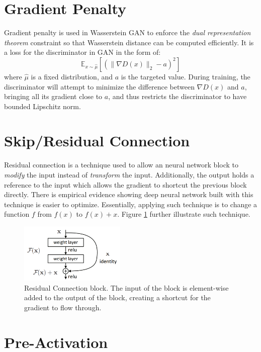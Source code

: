 \section{Gradient Penalty}
\label{app:ml:grad_pen}
Gradient penalty is used in Wasserstein GAN to enforce the \textit{dual representation theorem} constraint so that Wasserstein distance can be computed efficiently. It is a loss for the discriminator in GAN in the form of:
$$
\mathbb{E}_{x \sim \hat{\mu}}\left[\left(\|\nabla D(x)\|_{2}-a\right)^{2}\right]
$$
where $\hat{\mu}$ is a fixed distribution, and $a$ is the targeted value. During training, the discriminator will attempt to minimize the difference between $\nabla D(x)$ and $a$, bringing all its gradient close to $a$, and thus restricts the discriminator to have bounded Lipschitz norm.

\section{Skip/Residual Connection}
\label{app:ml:res_conn}
Residual connection is a technique used to allow an neural network block to \textit{modify} the  input instead of \textit{transform} the input. Additionally, the output holds a reference to the input which allows the gradient to shortcut the previous block directly. There is empirical evidence showing deep neural network built with this technique is easier to optimize. Essentially, applying such technique is to change a function $f$ from $f(x)$ to $f(x)+x$. Figure \ref{fig:res_conn} further illustrate such technique.

\begin{figure}
    \centering
    \includegraphics[width=0.45\textwidth]{images/preliminary/res_conn.png}
    \caption{Residual Connection block. The input of the block is element-wise added to the output of the block, creating a shortcut for the gradient to flow through.\cite{heDeepResidualLearning2015a}}
    \label{fig:res_conn}
\end{figure}

\section{Pre-Activation}
\label{app:ml:pre_act}

